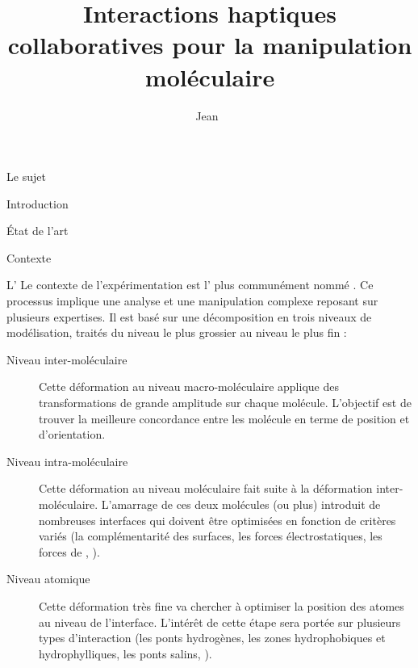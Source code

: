 \documentclass[myfrancais]{mythesis}
\title{Interactions haptiques collaboratives pour la manipulation moléculaire}
\author{Jean~\myname{Simard}}
\date{\mydate[datestyle=long]{01/12/2011}}
\begin{document}
	\frontmatter
	\maketitle
	\mytoc
	\mylof
	\mylot
	\mylotodo
	\mainmatter
	\begin{mypart}{Le sujet}
		\begin{mychapter}{Introduction}
			\begin{mysection}{État de l'art}
			\end{mysection}
			\begin{mysection}{Contexte}
				\begin{mysubsection}{L'}
					Le contexte de l'expérimentation est l' plus communément nommé .
					Ce processus implique une analyse et une manipulation complexe reposant sur plusieurs expertises.
					Il est basé sur une décomposition en trois niveaux de modélisation, traités du niveau le plus grossier au niveau le plus fin :
					\begin{description}
						\item[Niveau inter-moléculaire] Cette déformation au niveau macro-moléculaire applique des transformations de grande amplitude sur chaque molécule.
							L'objectif est de trouver la meilleure concordance entre les molécule en terme de position et d'orientation.
						\item[Niveau intra-moléculaire] Cette déformation au niveau moléculaire fait suite à la déformation inter-moléculaire.
							L'amarrage de ces deux molécules (ou plus) introduit de nombreuses interfaces qui doivent être optimisées en fonction de critères variés (la complémentarité des surfaces, les forces électrostatiques, les forces de  , \myetc).
						\item[Niveau atomique] Cette déformation très fine va chercher à optimiser la position des atomes au niveau de l'interface.
							L'intérêt de cette étape sera portée sur plusieurs types d'interaction (les ponts hydrogènes, les zones hydrophobiques et hydrophylliques, les ponts salins, \myetc).
					\end{description}


\end{mysubsection}
\end{mysection}
\end{mychapter}
\end{mypart}
\end{document}
